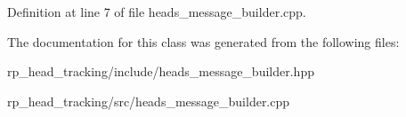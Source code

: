 \-Definition at line 7 of file heads\-\_\-message\-\_\-builder.\-cpp.



\-The documentation for this class was generated from the following files\-:\begin{DoxyCompactItemize}
\item 
rp\-\_\-head\-\_\-tracking/include/heads\-\_\-message\-\_\-builder.\-hpp\item 
rp\-\_\-head\-\_\-tracking/src/heads\-\_\-message\-\_\-builder.\-cpp\end{DoxyCompactItemize}
